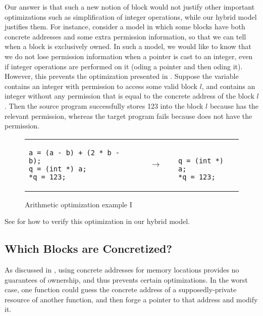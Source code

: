 Our answer is that such a new notion of block would not justify other important optimizations such
as simplification of integer operations, while our hybrid model justifies them.  For instance,
consider a model in which some blocks have both concrete addresses and some extra permission
information, so that we can tell when a block is exclusively owned. In such a model, we would like
to know that we do not lose permission information when a pointer is cast to an integer, even if
integer operations are performed on it (\eg {}oding a pointer and then
oding it).  However, this prevents the optimization presented in
.  Suppose the variable  contains an integer
with permission to access some valid block $l$, and  contains an integer without any
permission that is equal to the concrete address of the block $l$. Then the source program
successfully stores 123 into the block $l$ because  has the relevant permission, whereas the
target program fails because  does not have the permission.
%
\begin{figure}[t]
\center
\begin{tabular}{lll}
\begin{minipage}{0.4\textwidth}
\begin{verbatim}
a = (a - b) + (2 * b - b);
q = (int *) a;
*q = 123;
\end{verbatim}
\end{minipage}
&
$\quad\rightarrow\quad$
&
\begin{minipage}{0.2\textwidth}
\begin{verbatim}

q = (int *) a;
*q = 123;
\end{verbatim}
\end{minipage}
\end{tabular}
\caption{Arithmetic optimization example I}\label{fig:intptrcast:formal-semantics:arith1}
\end{figure}
%
See  for how to verify this optimization in our hybrid model.

\subsection{Which Blocks are Concretized?}
\label{sec:intptrcast:formal-semantics:cast}

As discussed in , using concrete addresses for memory locations provides
no guarantees of ownership, and thus prevents certain optimizations. In the worst case, one function
could guess the concrete address of a supposedly-private resource of another function, and then
forge a pointer to that address and modify it.

